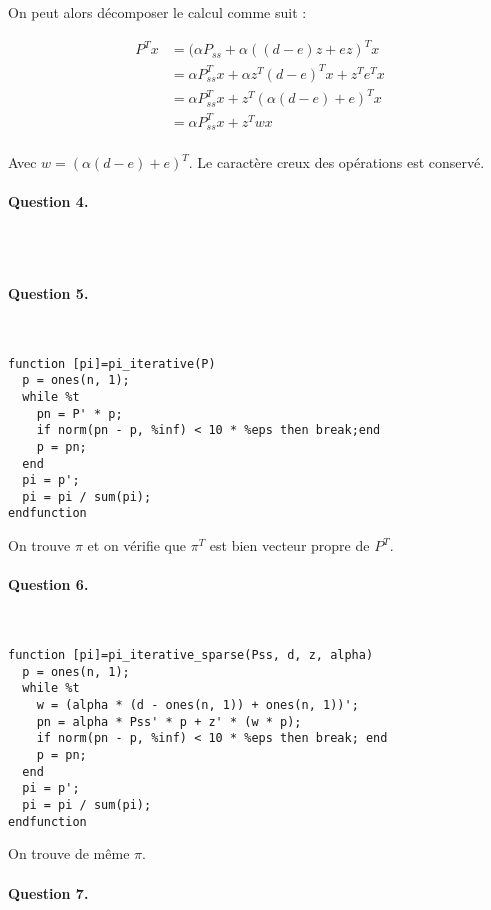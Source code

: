 \documentclass[12pt,a4paper]{article}
\begin{document}
On peut alors décomposer le calcul comme suit :

\begin{align*}
P^T x
&= (\alpha P_{ss} + \alpha ((d - e) z + ez)^T x \\
&= \alpha P_{ss}^T x + \alpha z^T (d - e)^T x + z^T e^T x \\
&= \alpha P_{ss}^T x + z^T (\alpha (d - e) + e)^T x \\
&= \alpha P_{ss}^T x + z^T w x \\
\end{align*}

Avec $w = (\alpha (d - e) + e)^T$. Le caractère creux des opérations est conservé.

\paragraph*{Question 4.}
~
\begin{lstlisting}

\end{lstlisting}

\paragraph*{Question 5.}
~
\begin{lstlisting}
function [pi]=pi_iterative(P)
  p = ones(n, 1);
  while %t
    pn = P' * p;
    if norm(pn - p, %inf) < 10 * %eps then break;end
    p = pn;
  end
  pi = p';
  pi = pi / sum(pi);
endfunction
\end{lstlisting}

On trouve $\pi$ et on vérifie que $\pi^T$ est bien vecteur propre de $P^T$.

\paragraph*{Question 6.}
~
\begin{lstlisting}
function [pi]=pi_iterative_sparse(Pss, d, z, alpha)
  p = ones(n, 1);
  while %t
    w = (alpha * (d - ones(n, 1)) + ones(n, 1))';
    pn = alpha * Pss' * p + z' * (w * p);
    if norm(pn - p, %inf) < 10 * %eps then break; end
    p = pn;
  end
  pi = p';
  pi = pi / sum(pi);
endfunction
\end{lstlisting}

On trouve de même $\pi$.

\paragraph*{Question 7.}
\end{document}
